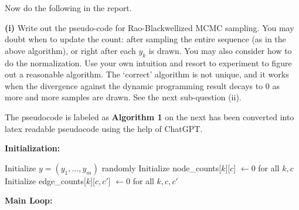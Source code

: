 \documentclass[11pt]{report}
\begin{document}
\begin{itemize}
	Now do the following in the report.
	
	\textbf{(i)}  Write out the pseudo-code for Rao-Blackwellized MCMC sampling.  
	You may doubt when to update the count:
	after sampling the entire sequence (as in the above algorithm),
	or right after each $y_k$ is drawn.
	You may also consider how to do the normalization.
	Use your own intuition and resort to experiment to figure out a reasonable algorithm.
	The `correct' algorithm is not unique, and it works when the divergence against the dynamic programming result decays to 0 as more and more samples are drawn.
	See the next sub-question (ii).

	\textcolor{b}{The pseudocode is labeled as \textbf{Algorithm 1} on the next has been converted into latex readable pseudocode using the help of ChatGPT.}

	\begin{algorithm}
	\caption{Rao-Blackwellized Gibbs Sampling for CRF Marginals}

	\textbf{Initialization:}

	Initialize $y = (y_1, \dots, y_m)$ randomly\;
	Initialize node\_counts[$k$][$c$] $\gets 0$ for all $k,c$\;
	Initialize edge\_counts[$k$][$c,c'$] $\gets 0$ for all $k,c,c'$\;

	\BlankLine

	\textbf{Main Loop:}

\end{algorithm}
\end{itemize}
\end{document}
